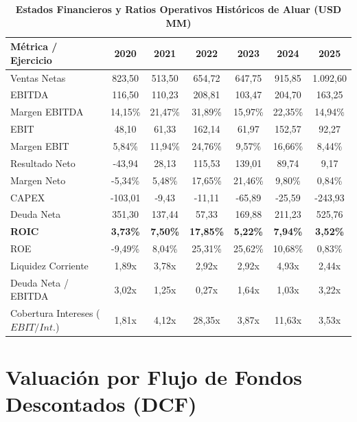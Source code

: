 \documentclass[11pt,a4paper]{article}
\begin{document}
\begin{table}[H]
\centering
\caption{\textbf{Estados Financieros y Ratios Operativos Históricos de Aluar (USD MM)}}
\scriptsize
\begin{tabularx}{\textwidth}{Xcccccc}
\toprule
\textbf{Métrica / Ejercicio} & \textbf{2020} & \textbf{2021} & \textbf{2022} & \textbf{2023} & \textbf{2024} & \textbf{2025} \\
\midrule
Ventas Netas & 823,50 & 513,50 & 654,72 & 647,75 & 915,85 & 1.092,60 \\
EBITDA & 116,50 & 110,23 & 208,81 & 103,47 & 204,70 & 163,25 \\
Margen EBITDA & 14,15\% & 21,47\% & 31,89\% & 15,97\% & 22,35\% & 14,94\% \\
EBIT & 48,10 & 61,33 & 162,14 & 61,97 & 152,57 & 92,27 \\
Margen EBIT & 5,84\% & 11,94\% & 24,76\% & 9,57\% & 16,66\% & 8,44\% \\
Resultado Neto & -43,94 & 28,13 & 115,53 & 139,01 & 89,74 & 9,17 \\
Margen Neto & -5,34\% & 5,48\% & 17,65\% & 21,46\% & 9,80\% & 0,84\% \\
CAPEX & -103,01 & -9,43 & -11,11 & -65,89 & -25,59 & -243,93 \\
Deuda Neta & 351,30 & 137,44 & 57,33 & 169,88 & 211,23 & 525,76 \\
\midrule
\textbf{ROIC} & \textbf{3,73\%} & \textbf{7,50\%} & \textbf{17,85\%} & \textbf{5,22\%} & \textbf{7,94\%} & \textbf{3,52\%} \\
ROE & -9,49\% & 8,04\% & 25,31\% & 25,62\% & 10,68\% & 0,83\% \\
Liquidez Corriente & 1,89x & 3,78x & 2,92x & 2,92x & 4,93x & 2,44x \\
Deuda Neta / EBITDA & 3,02x & 1,25x & 0,27x & 1,64x & 1,03x & 3,22x \\
Cobertura Intereses ($EBIT/Int.$) & 1,81x & 4,12x & 28,35x & 3,87x & 11,63x & 3,53x \\
\bottomrule
\end{tabularx}
\end{table}

\section{Valuación por Flujo de Fondos Descontados (DCF)}
\end{document}
